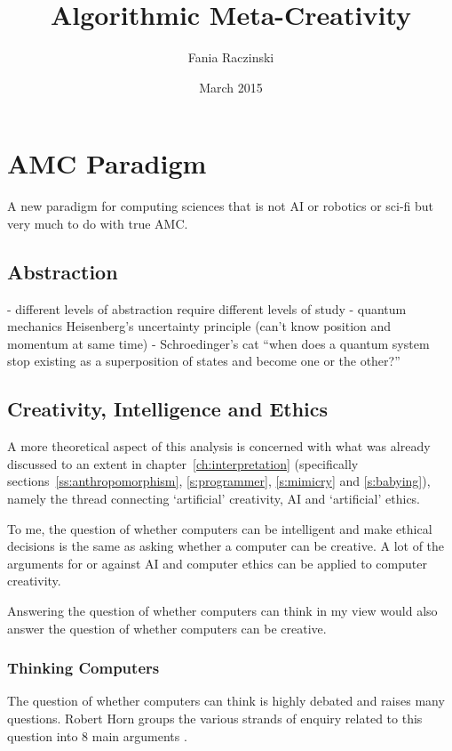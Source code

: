 \documentclass[11pt]{thesis} %
\title{Algorithmic Meta-Creativity}
\author{Fania Raczinski}
\date{March 2015}
\begin{document}
\chapter{AMC Paradigm}

A new paradigm for computing sciences that is not AI or robotics or sci-fi but very much to do with true AMC.


\section{Abstraction}

- different levels of abstraction require different levels of study
- quantum mechanics Heisenberg's uncertainty principle (can't know position and momentum at same time)
- Schroedinger's cat ``when does a quantum system stop existing as a superposition of states and become one or the other?''


\section{Creativity, Intelligence and Ethics}

A more theoretical aspect of this analysis is concerned with what was already discussed to an extent in chapter~\ref{ch:interpretation} (specifically sections~\ref{ss:anthropomorphism}, \ref{s:programmer}, \ref{s:mimicry} and \ref{s:babying}), namely the thread connecting `artificial' creativity, \acl{AI} and `artificial' ethics.

To me, the question of whether computers can be intelligent and make ethical decisions is the same as asking whether a computer can be creative. A lot of the arguments for or against \ac{AI} and computer ethics can be applied to computer creativity.  

Answering the question of whether computers can think in my view would also answer the question of whether computers can be creative.


\subsection{Thinking Computers}
 
The question of whether computers can think is highly debated and raises many questions. Robert Horn groups the various strands of enquiry related to this question into 8 main arguments \citeyear{Horn2009}. 
\end{document}
